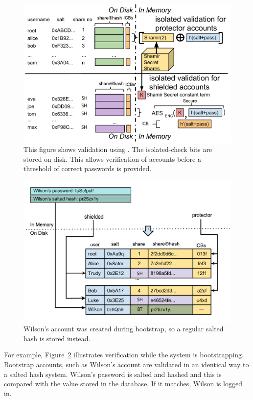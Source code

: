 \begin{figure}
    \includegraphics[width=1\linewidth]{./images/pph-with-partial-bytes.pdf}
    \caption{This figure shows validation using \partialverification. The
    isolated-check bits are stored on disk. This allows verification of accounts
    before a threshold of correct passwords is provided.  } 
    \label{FIGURE:isolated-verification}
\end{figure}

\begin{figure}
    \includegraphics[width=1\linewidth]{./images/bootstrap.pdf}
    \caption{Wilson's account was created during bootstrap, so a regular
    salted hash is stored instead.} 
        \label{FIGURE:bootstrap-verification}
\end{figure}

For example, Figure~\ref{FIGURE:bootstrap-verification} illustrates 
verification while the system is bootstrapping.  Bootstrap accounts, such
as Wilson's account are validated in an identical way to a salted hash
system.  Wilson's password is salted and hashed and this is compared
with the value stored in the database.  If it matches, Wilson is logged in.

